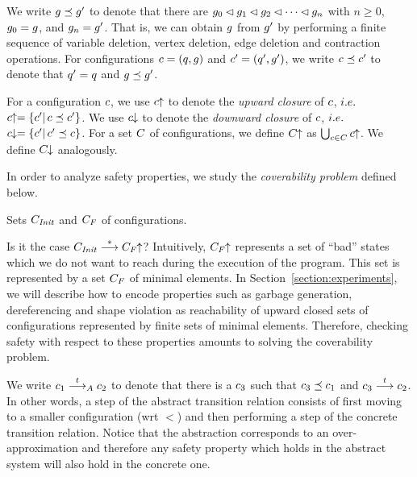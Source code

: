 %
%
We write $g\preceq g'$ to denote that there are
$g_0\lhd g_1\lhd g_2\lhd\cdots\lhd g_n$ with $n\geq
0$, $g_0=g$, and $g_n=g'$.
%
That is, we can obtain $g$ from $g'$ by performing a finite
sequence of variable deletion, vertex deletion, edge deletion and contraction operations.
%
For configurations $c=\left(q,g\right)$ and
$c'=\left(q',g'\right)$, we write $c\preceq c'$ to
denote that $q'=q$ and $g\preceq g'$.
%

For a configuration $c$, we use $c\!\!\uparrow$ to denote the %
{\it upward closure} of $c$, $i.e.\ $
$c\!\!\uparrow=\left\{c'|\,c\preceq c'\right\}$.
%
We use $c\!\!\downarrow$ to denote the
{\it downward closure} of $c$, $i.e.\ $
$c\!\!\downarrow=\left\{c'|\,c'\preceq c\right\}$.
%
For a set $C$ of configurations, we define $C\!\!\uparrow$ as
$\bigcup_{c\in C}c\!\!\uparrow$.
%
We define $C\!\!\downarrow$ analogously.

\smallskip{}
In order to analyze safety properties, we
study the {\it coverability problem} defined below.
%

{%
  \item Sets $C_{\it Init}$ and $C_F$ of configurations.
}{%
Is it the case $C_{\it Init}\stackrel{*}{\longrightarrow}C_F\!\!\uparrow$?
}
\newline
Intuitively, $C_F\!\!\uparrow$ represents a set of ``bad'' states which we do not 
want to reach during the execution of the program.
%
This set is represented by a set $C_F$ of minimal elements.
%
In Section~\ref{section:experiments}, we will describe how to encode
properties such as garbage generation, dereferencing and shape
violation as reachability of upward closed sets of configurations
represented by finite sets of minimal elements.
%
Therefore, checking safety with respect to these properties
amounts to solving the coverability problem.

\smallskip{}
We write $c_1\stackrel{t}{\longrightarrow}_Ac_2$ to denote that there is a $c_3$ such that
$c_3\preceq c_1$ and $c_3\stackrel{t}{\longrightarrow}c_2$.
%
In other words, a step of the abstract transition relation consists of first moving to 
a smaller configuration (wrt $\lt$) and then performing a step of the concrete transition relation.
%
Notice that the abstraction corresponds to an over-approximation and therefore
any safety property which holds in the abstract system will also hold in the 
concrete one.
